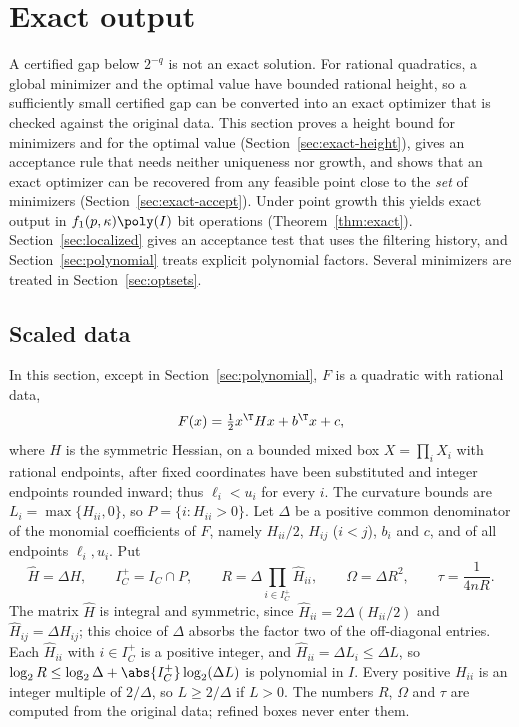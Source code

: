 \section{Exact output}\label{sec:exact}

A certified gap below $2^{-q}$ is not an exact solution. For rational
quadratics, a global minimizer and the optimal value have bounded rational
height, so a sufficiently small certified gap can be converted into an exact
optimizer that is checked against the original data. This section proves a
height bound for minimizers and for the optimal value
(Section~\ref{sec:exact-height}), gives an acceptance rule that needs neither
uniqueness nor growth, and shows that an exact optimizer can be recovered from
any feasible point close to the \emph{set} of minimizers
(Section~\ref{sec:exact-accept}). Under point growth this yields exact output
in $f_1(p,\kappa)\poly(I)$ bit operations (Theorem~\ref{thm:exact}).
Section~\ref{sec:localized} gives an acceptance test that uses the filtering
history, and Section~\ref{sec:polynomial} treats explicit polynomial factors.
Several minimizers are treated in Section~\ref{sec:optsets}.

\subsection{Scaled data}\label{sec:exact-data}

In this section, except in Section~\ref{sec:polynomial}, $F$ is a quadratic
with rational data,
\[
F(x)=\tfrac12x^{\T}Hx+b^{\T}x+c ,
\]
where $H$ is the symmetric Hessian, on a bounded mixed box
$X=\prod_iX_i$ with rational endpoints, after fixed coordinates have been
substituted and integer endpoints rounded inward; thus $\ell_i<u_i$ for every
$i$. The curvature bounds are $L_i=\max\{H_{ii},0\}$, so
$P=\{i:H_{ii}>0\}$. Let $\Delta$ be a positive common denominator of the
monomial coefficients of $F$, namely $H_{ii}/2$, $H_{ij}$ ($i<j$), $b_i$ and
$c$, and of all endpoints $\ell_i,u_i$. Put
\begin{equation}\label{eq:exact-constants}
\hat H=\Delta H,\qquad I_C^+=I_C\cap P,\qquad
R=\Delta\prod_{i\in I_C^+}\hat H_{ii},\qquad \Omega=\Delta R^2,\qquad
\tau=\frac1{4nR}.
\end{equation}
The matrix $\hat H$ is integral and symmetric, since
$\hat H_{ii}=2\Delta(H_{ii}/2)$ and $\hat H_{ij}=\Delta H_{ij}$; this choice of
$\Delta$ absorbs the factor two of the off-diagonal entries. Each
$\hat H_{ii}$ with $i\in I_C^+$ is a positive integer, and
$\hat H_{ii}=\Delta L_i\le\Delta L$, so
$\log_2R\le\log_2\Delta+\abs{I_C^+}\log_2(\Delta L)$ is polynomial in $I$.
Every positive $H_{ii}$ is an integer multiple of $2/\Delta$, so $L\ge2/\Delta$
if $L>0$. The numbers $R$, $\Omega$ and $\tau$ are computed from the original
data; refined boxes never enter them.

